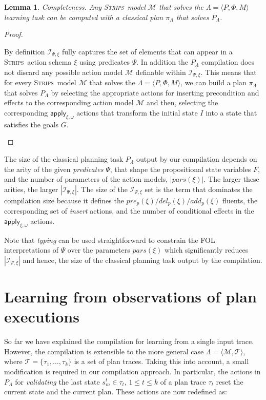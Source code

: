 \documentclass{article}
\newcommand{\tup}[1]{{\langle #1 \rangle}}
\newcommand{\strips}{\textsc{Strips}}
\newtheorem{mylemma}[mytheorem]{Lemma}
\begin{document}
\begin{mylemma}
Completeness. Any \strips\ model $\mathcal{M}$ that solves the $\Lambda=\tup{P,\Phi,M}$ learning task can be computed with a classical plan $\pi_{\Lambda}$ that solves $P_{\Lambda}$.
\end{mylemma}

\begin{proof}[Proof]
\begin{small}
By definition ${\mathcal I}_{\Psi,\xi}$ fully captures the set of elements that can appear in a \strips\ action schema $\xi$ using predicates $\Psi$. In addition the $P_{\Lambda}$ compilation does not discard any possible action model $\mathcal{M}$ definable within ${\mathcal I}_{\Psi,\xi}$. This means that for every \strips\ model $\mathcal{M}$ that solves the $\Lambda=\tup{P,\Phi,M}$, we can build a plan $\pi_{\Lambda}$ that solves $P_{\Lambda}$ by selecting the appropriate actions for inserting precondition and effects to the corresponding action model $\mathcal{M}$ and then, selecting the corresponding $\mathsf{apply_{\xi,\omega}}$ actions that transform the initial state $I$ into a state that satisfies the goals $G$.
\end{small}
\end{proof}

The size of the classical planning task $P_{\Lambda}$ output by our compilation depends on the arity of the given {\em predicates} $\Psi$, that shape the propositional state variables $F$, and the number of parameters of the action models, $|pars(\xi)|$. The larger these arities, the larger $|{\mathcal I}_{\Psi,\xi}|$. The size of the ${\mathcal I}_{\Psi,\xi}$ set is the term that dominates the compilation size because it defines the $pre_p(\xi)/del_p(\xi)/add_p(\xi)$ fluents, the corresponding set of {\em insert} actions, and the number of conditional effects in the $\mathsf{apply_{\xi,\omega}}$ actions.

Note that {\em typing} can be used straightforward to constrain the FOL interpretations of $\Psi$ over the parameters $pars(\xi)$ which significantly reduces $|{\mathcal I}_{\Psi,\xi}|$ and hence, the size of the classical planning task output by the compilation.


\section{Learning from observations of plan executions}
\label{sec:observations}
So far we have explained the compilation for learning from a single input trace. However, the compilation is extensible to the more general case $\Lambda=\tup{\mathcal{M},\mathcal{T}}$, where $\mathcal{T}=\{\tau_1,\ldots,\tau_k\}$ is a set of plan traces. Taking this into account, a small modification is required in our compilation approach. In particular, the actions in $P_{\Lambda}$ for {\em validating} the last state $s_m^t\in \tau_t$, {\tt\small $1\leq t\leq k$} of a plan trace $\tau_t$ reset the current state and the current plan. These actions are now redefined as:
\end{document}
